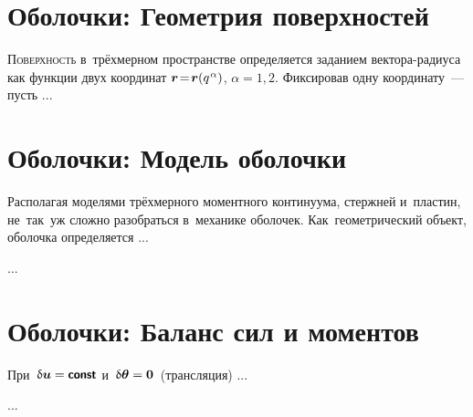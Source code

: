 

\thispagestyle{empty}

\label{chapter:shellsandplates}

\begin{otherlanguage}{russian}

\section{Оболочки: Геометрия поверхностей}

\lettrine[lines=2, findent=2pt, nindent=0pt]{П}{оверхность} в~трёхмерном пространстве определяется заданием вектора\hbox{-}радиуса как функции двух координат ${\bm{r} \!=\! \bm{r}(q^{\hspace{.16ex}\alpha})}$, ${\alpha = 1, 2}$. Фиксировав одну координату~--- пусть ...




\section{Оболочки: Модель оболочки}

Располагая моделями трёхмерного моментного континуума, стержней и~пластин, не~так~уж сложно разобраться в~механике оболочек. Как~геометрический объект, оболочка определяется ...

...




\section{Оболочки: Баланс сил и моментов}

При~${\variation{\bm{u}} = \boldconst}$ и~${\updelta\hspace{-0.1ex}\bm{\theta} = \bm{0}}$~(трансляция) ...

...






\end{otherlanguage}
